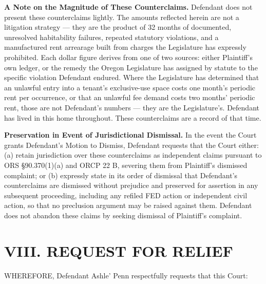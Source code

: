 \documentclass[12pt,letterpaper]{article}
\begin{document}
\textbf{A Note on the Magnitude of These Counterclaims.} Defendant does not present these counterclaims lightly. The amounts reflected herein are not a litigation strategy --- they are the product of 32 months of documented, unresolved habitability failures, repeated statutory violations, and a manufactured rent arrearage built from charges the Legislature has expressly prohibited. Each dollar figure derives from one of two sources: either Plaintiff's own ledger, or the remedy the Oregon Legislature has assigned by statute to the specific violation Defendant endured. Where the Legislature has determined that an unlawful entry into a tenant's exclusive-use space costs one month's periodic rent per occurrence, or that an unlawful fee demand costs two months' periodic rent, those are not Defendant's numbers --- they are the Legislature's. Defendant has lived in this home throughout. These counterclaims are a record of that time.

\textbf{Preservation in Event of Jurisdictional Dismissal.} In the event the Court grants Defendant's Motion to Dismiss, Defendant requests that the Court either: (a) retain jurisdiction over these counterclaims as independent claims pursuant to ORS \S90.370(1)(a) and ORCP 22 B, severing them from Plaintiff's dismissed complaint; or (b) expressly state in its order of dismissal that Defendant's counterclaims are dismissed without prejudice and preserved for assertion in any subsequent proceeding, including any refiled FED action or independent civil action, so that no preclusion argument may be raised against them. Defendant does not abandon these claims by seeking dismissal of Plaintiff's complaint.

\section*{VIII. REQUEST FOR RELIEF}

WHEREFORE, Defendant Ashle' Penn respectfully requests that this Court:
\end{document}
